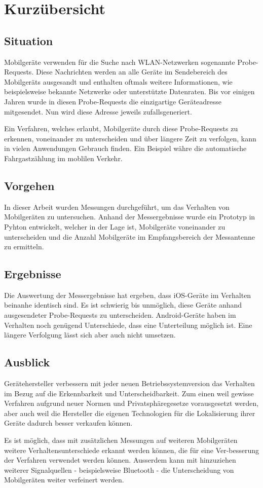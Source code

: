 \cleardoublepage

\section*{Kurzübersicht}

\subsection*{Situation}
Mobilgeräte verwenden für die Suche nach WLAN-Netzwerken sogenannte Probe-Requests.
Diese Nachrichten werden an alle Geräte im Sendebereich des Mobilgeräts ausgesandt
und enthalten oftmals weitere Informationen, wie beispielsweise bekannte 
Netzwerke oder unterstützte Datenraten.
Bis vor einigen Jahren wurde in diesen Probe-Requests die einzigartige 
Geräteadresse mitgesendet. Nun wird diese Adresse jeweils zufallsgeneriert.

Ein Verfahren, welches erlaubt, Mobilgeräte durch diese Probe-Requests zu 
erkennen, voneinander zu unterscheiden und über längere Zeit zu 
verfolgen, kann in vielen Anwendungen Gebrauch finden. Ein Beispiel währe 
die automatische Fahrgastzählung im moblilen Verkehr.


\subsection*{Vorgehen}
In dieser Arbeit wurden Messungen durchgeführt, um das Verhalten von Mobilgeräten
zu untersuchen. Anhand der Messergebnisse wurde ein Prototyp in Pyhton entwickelt,
welcher in der Lage ist, Mobilgeräte voneinander zu unterscheiden und die 
Anzahl Mobilgeräte im Empfangsbereich der Messantenne zu ermitteln.

\subsection*{Ergebnisse}
Die Auswertung der Messergebnisse hat ergeben, dass iOS-Geräte im Verhalten
beinanhe identisch sind. Es ist schwierig bis unmöglich, diese Geräte 
anhand ausgesendeter Probe-Requests zu unterscheiden. 
Android-Geräte haben im Verhalten noch genügend Unterschiede, dass eine 
Unterteilung möglich ist. Eine längere Verfolgung lässt sich aber auch 
nicht umsetzen.  

\subsection*{Ausblick}
Gerätehersteller verbessern mit jeder neuen Betriebssystemversion das Verhalten 
im Bezug auf die Erkennbarkeit und Unterscheidbarkeit. Zum einen weil gewisse 
Verfahren aufgrund neuer Normen und Privatsphäregesetze vorausgesetzt werden,
aber auch weil die Hersteller die eigenen Technologien für die Lokalisierung 
ihrer Geräte dadurch besser verkaufen können.

Es ist möglich, dass mit zusätzlichen Messungen auf weiteren Mobilgeräten 
weitere Verhaltensunterschiede erkannt werden können, die für eine Ver-besserung
der Verfahren verwendet werden können. Ausserdem kann mit hinzuziehen weiterer
Signalquellen - beispielsweise Bluetooth - die Unterscheidung von Mobilgeräten 
weiter verfeinert werden. 


